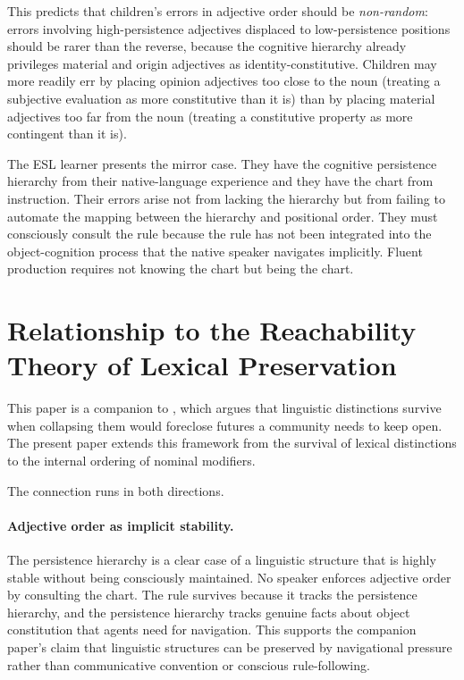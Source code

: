 \documentclass[11pt]{article}
\theoremstyle{rthm}
\theoremstyle{rdef}
\theoremstyle{remark}
\begin{document}
This predicts that children's errors in adjective order should be
\emph{non-random}: errors involving high-persistence adjectives displaced to
low-persistence positions should be rarer than the reverse, because the
cognitive hierarchy already privileges material and origin adjectives as
identity-constitutive. Children may more readily err by placing opinion
adjectives too close to the noun (treating a subjective evaluation as more
constitutive than it is) than by placing material adjectives too far from
the noun (treating a constitutive property as more contingent than it is).

The ESL learner presents the mirror case. They have the cognitive persistence
hierarchy from their native-language experience and they have the chart from
instruction. Their errors arise not from lacking the hierarchy but from
failing to automate the mapping between the hierarchy and positional order.
They must consciously consult the rule because the rule has not been
integrated into the object-cognition process that the native speaker navigates
implicitly. Fluent production requires not knowing the chart but being the
chart.

\section{Relationship to the Reachability Theory of Lexical Preservation}
\label{sec:connection}

This paper is a companion to \cite{flyxion2026}, which argues that linguistic
distinctions survive when collapsing them would foreclose futures a community
needs to keep open. The present paper extends this framework from the
survival of lexical distinctions to the internal ordering of nominal modifiers.

The connection runs in both directions.

\paragraph{Adjective order as implicit stability.}
The persistence hierarchy is a clear case of a linguistic structure that is
highly stable without being consciously maintained. No speaker enforces
adjective order by consulting the chart. The rule survives because it tracks
the persistence hierarchy, and the persistence hierarchy tracks genuine facts
about object constitution that agents need for navigation. This supports the
companion paper's claim that linguistic structures can be preserved by
navigational pressure rather than communicative convention or conscious
rule-following.
\end{document}
